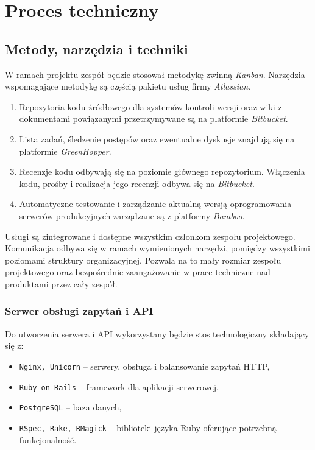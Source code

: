 \newpage
\section{Proces techniczny}

\subsection{Metody, narzędzia i techniki}
W ramach projektu zespół będzie stosował metodykę zwinną \emph{Kanban}.
Narzędzia wspomagające metodykę są częścią pakietu usług firmy \emph{Atlassian}.
\begin{enumerate}
    \item Repozytoria kodu źródłowego dla systemów kontroli wersji oraz wiki z
        dokumentami powiązanymi przetrzymywane są na platformie
        \emph{Bitbucket}.
    \item Lista zadań, śledzenie postępów oraz ewentualne dyskusje znajdują się
        na platformie \emph{GreenHopper}.
    \item Recenzje kodu odbywają się na poziomie głównego repozytorium.
        Włączenia kodu, prośby i realizacja jego recenzji odbywa się na
        \emph{Bitbucket}.
    \item Automatyczne testowanie i zarządzanie aktualną wersją oprogramowania
        serwerów produkcyjnych zarządzane są z platformy \emph{Bamboo}.
\end{enumerate}
Usługi są zintegrowane i dostępne wszystkim członkom zespołu projektowego.
Komunikacja odbywa się w ramach wymienionych narzędzi, pomiędzy wszystkimi
poziomami struktury organizacyjnej. Pozwala na to mały rozmiar zespołu
projektowego oraz bezpośrednie zaangażowanie w prace techniczne nad produktami
przez cały zespół.

\subsubsection{Serwer obsługi zapytań i API}
Do utworzenia serwera i API wykorzystany będzie stos technologiczny
składający się z:
\begin{itemize}[nosep]
    \item \texttt{Nginx, Unicorn} -- serwery, obsługa i balansowanie zapytań HTTP,
    \item \texttt{Ruby on Rails} -- framework dla aplikacji serwerowej,
    \item \texttt{PostgreSQL} -- baza danych,
    \item \texttt{RSpec, Rake, RMagick} -- biblioteki języka Ruby oferujące
        potrzebną funkcjonalność.
\end{itemize}

